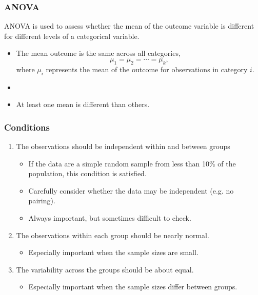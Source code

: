 \documentclass[notes,11pt, aspectratio=169]{beamer}
\begin{document}

\begin{frame}
\frametitle{ANOVA}

ANOVA is used to assess whether the mean of the outcome variable is different for different levels of a categorical variable.

\pause

\begin{itemize}
\item[]  The mean outcome is the same across all categories, 
\[\mu_1 = \mu_2 = \cdots = \mu_k, \]
where $\mu_i$ represents the mean of the outcome for observations in category $i$.
\item[]
\item[]  At least one mean is different than others.
\end{itemize}

\end{frame}


\begin{frame}
\frametitle{Conditions}

\begin{enumerate}

\item The observations should be independent within and between groups

\begin{itemize}
\item If the data are a simple random sample from less than 10\% of the population, this condition is satisfied.
\item Carefully consider whether the data may be independent (e.g. no pairing). 
\item Always important, but sometimes difficult to check.
\end{itemize}

\pause

\item The observations within each group should be nearly normal.

\begin{itemize}
\item Especially important when the sample sizes are small.
\end{itemize}


\pause

\item The variability across the groups should be about equal.

\begin{itemize}
\item Especially important when the sample sizes differ between groups.
\end{itemize}


\end{enumerate}

\end{frame}
\end{document}
